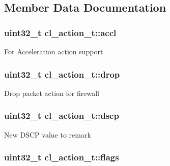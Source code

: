 \subsection{Member Data Documentation}
\hypertarget{structcl__action__t_a0be5ab503978c3b1df4db2e0bb6cfa3e}{
\subsubsection[{accl}]{\setlength{\rightskip}{0pt plus 5cm}uint32\-\_\-t cl\-\_\-action\-\_\-t\-::accl}}\label{structcl__action__t_a0be5ab503978c3b1df4db2e0bb6cfa3e}
For Acceleration action support \hypertarget{structcl__action__t_a38aa686bf4ea526cd44a6956b95391ff}{
\subsubsection[{drop}]{\setlength{\rightskip}{0pt plus 5cm}uint32\-\_\-t cl\-\_\-action\-\_\-t\-::drop}}\label{structcl__action__t_a38aa686bf4ea526cd44a6956b95391ff}
Drop packet action for firewall \hypertarget{structcl__action__t_ad1d7d787f8308358001d3e7a7a38e569}{
\subsubsection[{dscp}]{\setlength{\rightskip}{0pt plus 5cm}uint32\-\_\-t cl\-\_\-action\-\_\-t\-::dscp}}\label{structcl__action__t_ad1d7d787f8308358001d3e7a7a38e569}
New D\-S\-C\-P value to remark \hypertarget{structcl__action__t_a0ef7b8638843204cfa3dd74c26ab20a0}{
\subsubsection[{flags}]{\setlength{\rightskip}{0pt plus 5cm}uint32\-\_\-t cl\-\_\-action\-\_\-t\-::flags}}\label{structcl__action__t_a0ef7b8638843204cfa3dd74c26ab20a0}
